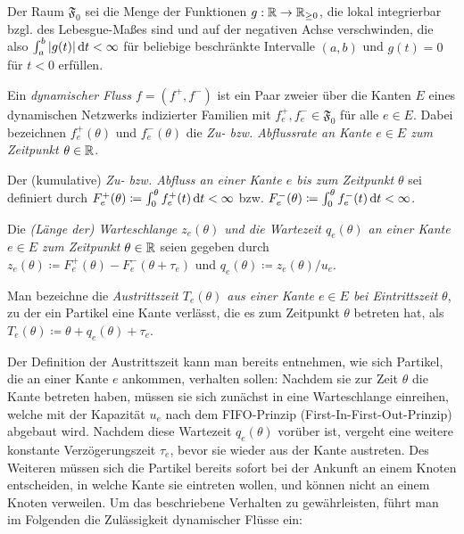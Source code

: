 \begin{definition}
	Der Raum $\mathfrak{F}_0$ sei die Menge der Funktionen $g: \mathbb{R} \to \mathbb{R}_{\geq 0}$, die lokal integrierbar bzgl. des Lebesgue-Maßes sind und auf der negativen Achse verschwinden, die also $\int_a^b |g(t)| \mathop{}\!\mathrm{d} t< \infty$ für beliebige beschränkte Intervalle $(a,b)$ und $g(t)=0$ für $t<0$ erfüllen.
\end{definition}

\begin{definition}
	Ein \emph{dynamischer Fluss $f=(f^+, f^-)$} ist ein Paar zweier über die Kanten $E$ eines dynamischen Netzwerks indizierter Familien mit $f^+_e,f^-_e\in\mathfrak F_0$ für alle $e\in E$.
	Dabei bezeichnen $f_e^+(\theta)$ und $f_e^-(\theta)$ die \emph{Zu- bzw. Abflussrate an Kante $e\in E$ zum Zeitpunkt $\theta\in\mathbb{R}$}.
	
	Der (kumulative) \emph{Zu- bzw. Abfluss an einer Kante $e$ bis zum Zeitpunkt $\theta$} sei definiert durch $F^+_e(\theta)\coloneq\int_0^\theta f^+_e(t) \mathop{}\!\mathrm{d} t<\infty$ bzw. $F^-_e(\theta)\coloneq\int_0^\theta f^-_e(t) \mathop{}\!\mathrm{d} t<\infty$.
	
	Die \emph{(Länge der) Warteschlange $z_e(\theta)$ und die Wartezeit $q_e(\theta)$ an einer Kante $e\in E$ zum Zeitpunkt $\theta\in\mathbb{R}$} seien gegeben durch $z_e(\theta)\coloneq F_e^+(\theta) - F_e^-(\theta + \tau_e)$ und $q_e(\theta) \coloneq z_e(\theta) / u_e$.
	
	Man bezeichne die \emph{Austrittszeit $T_e(\theta)$ aus einer Kante $e\in E$ bei Eintrittszeit $\theta$}, zu der ein Partikel eine Kante verlässt, die es zum Zeitpunkt $\theta$ betreten hat, als $T_e(\theta)\coloneq\theta + q_e(\theta) + \tau_e$.
\end{definition}

Der Definition der Austrittszeit kann man bereits entnehmen, wie sich Partikel, die an einer Kante $e$ ankommen, verhalten sollen:
Nachdem sie zur Zeit $\theta$ die Kante betreten haben, müssen sie sich zunächst in eine Warteschlange einreihen, welche mit der Kapazität $u_e$ nach dem FIFO-Prinzip (First-In-First-Out-Prinzip) abgebaut wird.
Nachdem diese Wartezeit $q_e(\theta)$ vorüber ist, vergeht eine weitere konstante Verzögerungszeit $\tau_e$, bevor sie wieder aus der Kante austreten.
Des Weiteren müssen sich die Partikel bereits sofort bei der Ankunft an einem Knoten entscheiden, in welche Kante sie eintreten wollen, und können nicht an einem Knoten verweilen.
Um das beschriebene Verhalten zu gewährleisten, führt man im Folgenden die Zulässigkeit dynamischer Flüsse ein:


